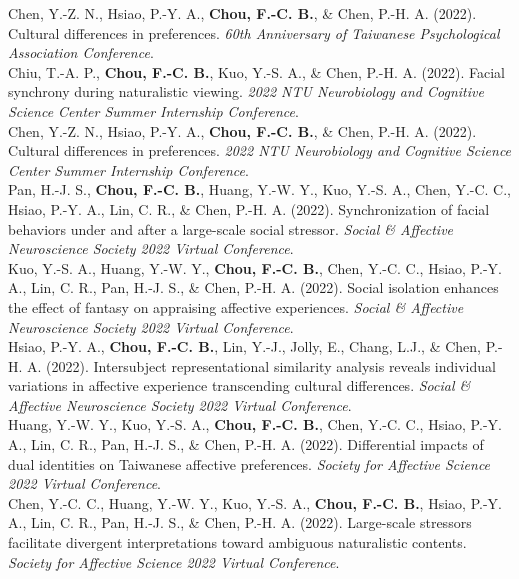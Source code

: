 \documentclass[a4paper,12pt]{article}
\newcommand{\itemspace}{7pt} %
\begin{document}
\noindent Chen, Y.-Z. N., Hsiao, P.-Y. A., \textbf{Chou, F.-C. B.}, \& Chen, P.-H. A. (2022). Cultural differences in preferences. \textit{60th Anniversary of Taiwanese Psychological Association Conference}.\\[\itemspace]
\noindent Chiu, T.-A. P., \textbf{Chou, F.-C. B.}, Kuo, Y.-S. A., \& Chen, P.-H. A. (2022). Facial synchrony during naturalistic viewing. \textit{2022 NTU Neurobiology and Cognitive Science Center Summer Internship Conference}.\\[\itemspace]
\noindent Chen, Y.-Z. N., Hsiao, P.-Y. A., \textbf{Chou, F.-C. B.}, \& Chen, P.-H. A. (2022). Cultural differences in preferences. \textit{2022 NTU Neurobiology and Cognitive Science Center Summer Internship Conference}.\\[\itemspace]
\noindent Pan, H.-J. S., \textbf{Chou, F.-C. B.}, Huang, Y.-W. Y., Kuo, Y.-S. A., Chen, Y.-C. C., Hsiao, P.-Y. A., Lin, C. R., \& Chen, P.-H. A. (2022). Synchronization of facial behaviors under and after a large-scale social stressor. \textit{Social \& Affective Neuroscience Society 2022 Virtual Conference}.\\[\itemspace]
\noindent Kuo, Y.-S. A., Huang, Y.-W. Y., \textbf{Chou, F.-C. B.}, Chen, Y.-C. C., Hsiao, P.-Y. A., Lin, C. R., Pan, H.-J. S., \& Chen, P.-H. A. (2022). Social isolation enhances the effect of fantasy on appraising affective experiences. \textit{Social \& Affective Neuroscience Society 2022 Virtual Conference}.\\[\itemspace]
\noindent Hsiao, P.-Y. A., \textbf{Chou, F.-C. B.}, Lin, Y.-J., Jolly, E., Chang, L.J., \& Chen, P.-H. A. (2022). Intersubject representational similarity analysis reveals individual variations in affective experience transcending cultural differences. \textit{Social \& Affective Neuroscience Society 2022 Virtual Conference}.\\[\itemspace]
\noindent Huang, Y.-W. Y., Kuo, Y.-S. A., \textbf{Chou, F.-C. B.}, Chen, Y.-C. C., Hsiao, P.-Y. A., Lin, C. R., Pan, H.-J. S., \& Chen, P.-H. A. (2022). Differential impacts of dual identities on Taiwanese affective preferences. \textit{Society for Affective Science 2022 Virtual Conference}.\\[\itemspace]
\noindent Chen, Y.-C. C., Huang, Y.-W. Y., Kuo, Y.-S. A., \textbf{Chou, F.-C. B.}, Hsiao, P.-Y. A., Lin, C. R., Pan, H.-J. S., \& Chen, P.-H. A. (2022). Large-scale stressors facilitate divergent interpretations toward ambiguous naturalistic contents. \textit{Society for Affective Science 2022 Virtual Conference}.\\[\itemspace]
\end{document}
